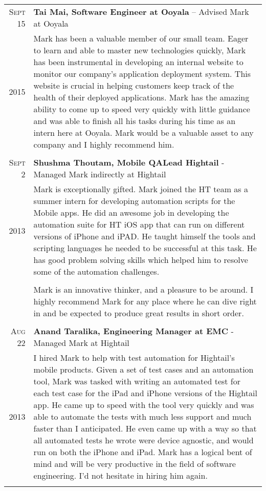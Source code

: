 \documentclass[a4paper,10pt]{article}
\begin{document}
\begin{tabular}{r|p{15cm}}	
 \textsc{Sept 15} & \textbf{Tai Mai, Software Engineer at Ooyala} – Advised Mark at Ooyala\\ 
 \textsc{2015} & Mark has been a valuable member of our small team. Eager to learn and able to master new technologies quickly, Mark has been instrumental in developing an internal website to monitor our company’s application deployment system. This website is crucial in helping customers keep track of the health of their deployed applications. Mark has the amazing ability to come up to speed very quickly with little guidance and was able to finish all his tasks during his time as an intern here at Ooyala. Mark would be a valuable asset to any company and I highly recommend him. \\
 \multicolumn{2}{c}{} \\
 
 \textsc{Sept 2} & \textbf{Shushma Thoutam, Mobile QALead Hightail} - Managed Mark indirectly at Hightail\\ 
 \textsc{2013} & Mark is exceptionally gifted. Mark joined the HT team as a summer intern for developing automation scripts for the Mobile apps. He did an awesome job in developing the automation suite for HT iOS app that can run on different versions of iPhone and iPAD. He taught himself the tools and scripting languages he needed to be successful at this task. He has good problem solving skills which helped him to resolve some of the automation challenges. \\ \\
 & Mark is an innovative thinker, and a pleasure to be around. I highly recommend Mark for any place where he can dive right in and be expected to produce great results in short order. \\
 \multicolumn{2}{c}{} \\

 \textsc{Aug 22} & \textbf{Anand Taralika, Engineering Manager at EMC} - Managed Mark at Hightail\\ 
 \textsc{2013} & I hired Mark to help with test automation for Hightail's mobile products. Given a set of test cases and an automation tool, Mark was tasked with writing an automated test for each test case for the iPad and iPhone versions of the Hightail app. He came up to speed with the tool very quickly and was able to automate the tests with much less support and much faster than I anticipated. He even came up with a way so that all automated tests he wrote were device agnostic, and would run on both the iPhone and iPad. Mark has a logical bent of mind and will be very productive in the field of software engineering. I'd not hesitate in hiring him again. \\
 \multicolumn{2}{c}{} \\


\end{tabular}
\end{document}
